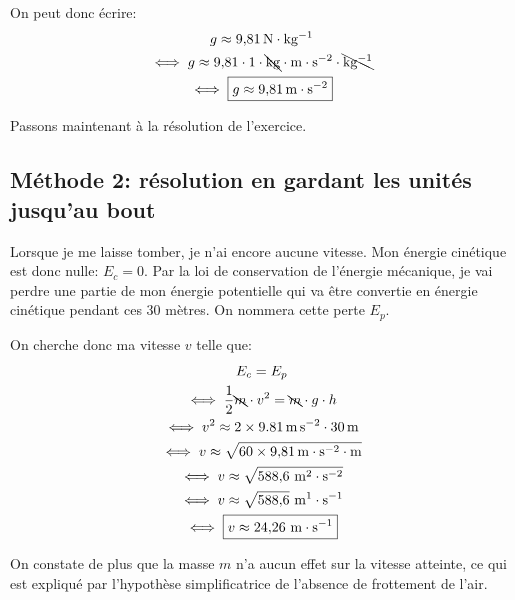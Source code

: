 On peut donc écrire:
\begin{gather*}
    g \approx 9{,}81 \,\mathrm{N \cdot kg^{-1}} \\
    \iff g \approx 9{,}81\cdot 1\cdot \bcancel{\mathrm{kg}} \cdot \mathrm{m} \cdot \mathrm{s^{-2}} \cdot \bcancel{\mathrm{kg^{-1}}} \\
    \iff \boxed{g \approx 9{,}81 \,\mathrm{m \cdot s^{-2}}}
\end{gather*}

Passons maintenant à la résolution de l'exercice.

\subsection{Méthode 2: résolution en gardant les unités jusqu'au bout}

Lorsque je me laisse tomber, je n'ai encore aucune vitesse. Mon énergie cinétique est donc nulle: $E_c = 0$. Par la loi de conservation de l'énergie mécanique, je vai perdre une partie de mon énergie potentielle qui va être convertie en énergie cinétique pendant ces 30 mètres. On nommera cette perte $E_p$.

On cherche donc ma vitesse $v$ telle que:
\begin{gather*}
    E_c = E_p \\
    \iff \frac{1}{2}{\bcancel{m}}\cdot v^2 = \bcancel{m} \cdot g \cdot h \\
    \iff v^2 \approx 2\times\SI{9.81}{\meter\per\second\squared} \cdot 30\,\mathrm{m} \\
    \iff v\approx\sqrt{60 \times 9{,}81 \,\mathrm{m \cdot s^{-2}} \cdot \mathrm{m}} \\       
    \iff v\approx\sqrt{588{,}6\ \mathrm{m^{2} \cdot s^{-2}}} \\
    \iff v\approx\sqrt{588{,}6}\ \mathrm{m^{1} \cdot s^{-1}} \\
    \iff \boxed {v \approx 24{,}26\ \mathrm{m \cdot s^{-1}}}
\end{gather*}

On constate de plus que la masse $m$ n'a aucun effet sur la vitesse atteinte, ce qui est expliqué par l'hypothèse simplificatrice de l'absence de frottement de l'air.